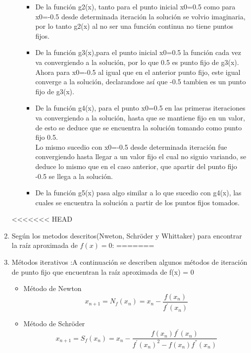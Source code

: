 \documentclass{udparticle}
\begin{document}
\begin{enumerate}
\begin{enumerate}
\begin{itemize}
\item De la función g2(x), tanto para el punto inicial x0=0.5 como para x0=-0.5 desde determinada iteración la solución se volvio imaginaria, por lo tanto g2(x) al no ser una función continua no tiene puntos fijos.
\item De la función g3(x),para el punto inicial x0=0.5 la función cada vez va convergiendo a la solución, por lo que 0.5 es punto fijo de g3(x).\\ Ahora para x0=-0.5 al igual que en el anterior punto fijo, este igual converge a la solución, declarandose así que -0.5 tambien es un punto fijo de g3(x).
\item De la función g4(x), para el punto x0=0.5 en las primeras iteraciones va convergiendo a la solución, hasta que se mantiene fijo en un valor, de esto se deduce que se encuentra la solución tomando como punto fijo 0.5.\\
Lo mismo sucedio con x0=-0.5 desde determinada iteración fue convergiendo hasta llegar a un valor fijo el cual no siguio variando, se deduce lo mismo que en el caso anterior, que apartir del punto fijo -0.5 se llega a la solución.
\item De la función g5(x) pasa algo similar a lo que sucedio con g4(x), las cuales se encuentra la solución a partir de los puntos fijos tomados.
\end{itemize}

\end{enumerate}
<<<<<<< HEAD
\item Según los metodos descritos(Nweton, Schröder y Whittaker) para encontrar la raíz aproximada de $f(x)=0$:
=======
\newpage
\item Métodos iterativos :A continuación se describen algunos métodos de iteración de punto fijo que encuentran la raíz aproximada de f(x) = 0
\begin{itemize}
        \item Método de Newton     
            \begin{equation*}
                 x_{n+1}=N_f(x_n)=x_n -  \frac{f(x_n)}{f^{'}(x_n)}
            \end{equation*}
        
        \item Método de Schröder
            \begin{equation*}
                x_{n+1}=S_f(x_n)=x_n-\frac{f(x_n)f^{'}(x_n)}{f^{'}(x_n)^{2}-f(x_n)f^{''}(x_n)}
            \end{equation*}
        

\end{itemize}
\end{enumerate}
\end{document}
